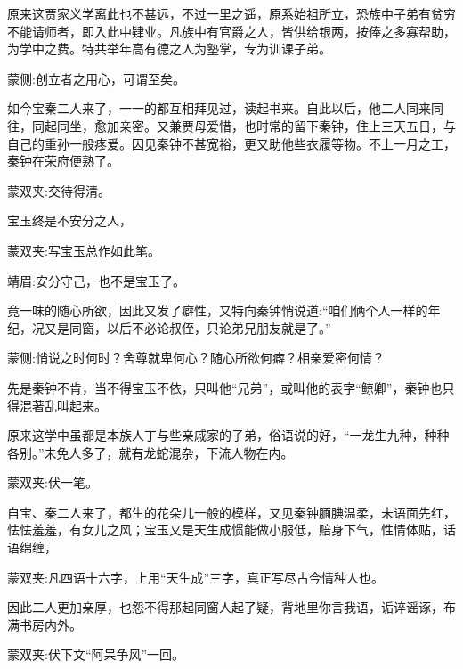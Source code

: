 \begin{parag}
    原来这贾家义学离此也不甚远，不过一里之遥，原系始祖所立，恐族中子弟有贫穷不能请师者，即入此中肄业。凡族中有官爵之人，皆供给银两，按俸之多寡帮助，为学中之费。特共举年高有德之人为塾掌，专为训课子弟。\begin{note}蒙侧:创立者之用心，可谓至矣。\end{note}如今宝秦二人来了，一一的都互相拜见过，读起书来。自此以后，他二人同来同往，同起同坐，愈加亲密。又兼贾母爱惜，也时常的留下秦钟，住上三天五日，与自己的重孙一般疼爱。因见秦钟不甚宽裕，更又助他些衣履等物。不上一月之工，秦钟在荣府便熟了。\begin{note}蒙双夹:交待得清。\end{note}宝玉终是不安分之人，\begin{note}蒙双夹:写宝玉总作如此笔。\end{note}\begin{note}靖眉:安分守己，也不是宝玉了。\end{note}竟一味的随心所欲，因此又发了癖性，又特向秦钟悄说道:“咱们俩个人一样的年纪，况又是同窗，以后不必论叔侄，只论弟兄朋友就是了。”\begin{note}蒙侧:悄说之时何时？舍尊就卑何心？随心所欲何癖？相亲爱密何情？\end{note}先是秦钟不肯，当不得宝玉不依，只叫他“兄弟”，或叫他的表字“鲸卿”，秦钟也只得混著乱叫起来。
\end{parag}


\begin{parag}
    原来这学中虽都是本族人丁与些亲戚家的子弟，俗语说的好，“一龙生九种，种种各别。”未免人多了，就有龙蛇混杂，下流人物在内。\begin{note}蒙双夹:伏一笔。\end{note}自宝、秦二人来了，都生的花朵儿一般的模样，又见秦钟腼腆温柔，未语面先红，怯怯羞羞，有女儿之风；宝玉又是天生成惯能做小服低，赔身下气，性情体贴，话语绵缠，\begin{note}蒙双夹:凡四语十六字，上用“天生成”三字，真正写尽古今情种人也。\end{note}因此二人更加亲厚，也怨不得那起同窗人起了疑，背地里你言我语，诟谇谣诼，布满书房内外。\begin{note}蒙双夹:伏下文“阿呆争风”一回。\end{note}
\end{parag}


